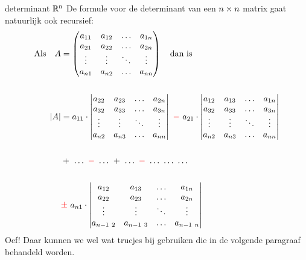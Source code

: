\newpage
\mydef
{determinant  ${\rm \mathbb{R}^{n}}$}
{De formule voor de determinant van een $n\ {\mkern-2mu\times\mkern-2mu}\ n$ matrix gaat natuurlijk ook recursief:   
\begin{align*}
	\text{Als} \quad A  &= 
	\begin{pmatrix}
	   a_{11} &  a_{12}  & \ldots & a_{1n}\\
	   a_{21}  &  a_{22} & \ldots & a_{2n}\\
	   \vdots & \vdots & \ddots & \vdots\\
	   a_{n1}  &   a_{n2}       &\ldots & a_{nn}
	\end{pmatrix} 	 \quad  \text{dan is} \\ \\
	|A| &= a_{11} \cdot    	 
	\begin{vmatrix}
	   a_{22}  &  a_{23} & \ldots & a_{2n}\\
	   a_{32}  &  a_{33} & \ldots & a_{3n}\\
	   \vdots & \vdots & \ddots & \vdots\\
	   a_{n2}  &   a_{n3}       &\ldots & a_{nn}
	\end{vmatrix} 
	\ \red{-}  \ a_{21} \cdot  	
	\begin{vmatrix}
	   a_{12} &  a_{13}  & \ldots & a_{1n}\\
	   a_{32}  &  a_{33} & \ldots & a_{3n}\\
	   \vdots & \vdots & \ddots & \vdots\\
	   a_{n2}  &   a_{n3}       &\ldots & a_{nn}
	\end{vmatrix} \\ \\
	& +\ \dots\ \red{-}\ \dots\ +\ \dots\ \red{-}\  \dots\ \dots\ \dots\\ \\
	&\red {\pm \ } a_{n1} \cdot    
	\begin{vmatrix}
	   a_{12} &  a_{13}  & \ldots & a_{1n}\\
	   a_{22}  &  a_{23} & \ldots & a_{2n}\\
	   \vdots & \vdots & \ddots & \vdots\\
	   a_{n-1 \ 2}  &   a_{n-1 \ 3}       &\ldots & a_{n-1 \ n}
	\end{vmatrix} 
\end{align*}
}
Oef! Daar kunnen we wel wat trucjes bij gebruiken die in de volgende paragraaf behandeld worden.
